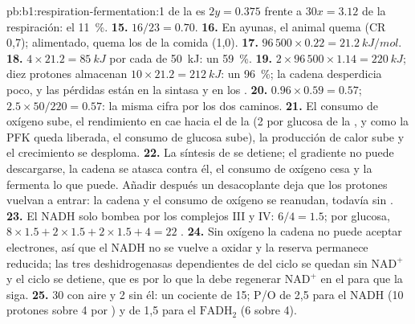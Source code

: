 \begin{solution}{pb:b1:respiration-fermentation:1}
de la  es $2y = 0.375$ frente a $30x = 3.12$ de la respiración:
el \qty{11}{\%}.
\textbf{15.} $16/23 = 0.70$.
\textbf{16.} En ayunas, el animal quema  (CR 0,7); alimentado, quema
los  de la comida (1,0).
\textbf{17.} $96\,500\times 0.22 = \qty{21.2}{kJ/mol}$.
\textbf{18.} $4\times 21.2 = \qty{85}{kJ}$ por cada  de \qty{50}{kJ}:
un \qty{59}{\%}.
\textbf{19.} $2\times 96\,500\times 1.14 = \qty{220}{kJ}$; diez protones
almacenan $10\times 21.2 = \qty{212}{kJ}$: un \qty{96}{\%}; la cadena
desperdicia poco, y las pérdidas están en la sintasa y en los
.
\textbf{20.} $0.96\times 0.59 = 0.57$; $2.5\times 50/220 = 0.57$: la misma
cifra por los dos caminos.
\textbf{21.} El consumo de oxígeno sube, el rendimiento en  cae hacia el
de la  (2 por glucosa de la , y como la PFK queda
liberada, el consumo de glucosa sube), la producción de calor sube y el
crecimiento se desploma.
\textbf{22.} La síntesis de  se detiene; el gradiente no puede
descargarse, la cadena se atasca contra él, el consumo de oxígeno cesa y la
 fermenta lo que puede. Añadir después un desacoplante deja que los
protones vuelvan a entrar: la cadena y el consumo de oxígeno se reanudan,
todavía sin .
\textbf{23.} El NADH solo bombea por los complejos III y IV: $6/4 = 1.5$;
por glucosa, $8\times 1.5 + 2\times 1.5 + 2\times 1.5 + 4 = 22$ .
\textbf{24.} Sin oxígeno la cadena no puede aceptar electrones, así que el
NADH no se vuelve a oxidar y la reserva permanece reducida; las tres
deshidrogenasas dependientes de  del ciclo se quedan sin
$\mathrm{NAD^+}$ y el ciclo se detiene, que es por lo que la 
debe regenerar $\mathrm{NAD^+}$ en el  para que la  siga.
\textbf{25.} 30  con aire y 2 sin él: un cociente de 15; P/O de 2,5 para
el NADH (10 protones sobre 4 por ) y de 1,5 para el $\mathrm{FADH_2}$ (6
sobre 4).
\end{solution}
